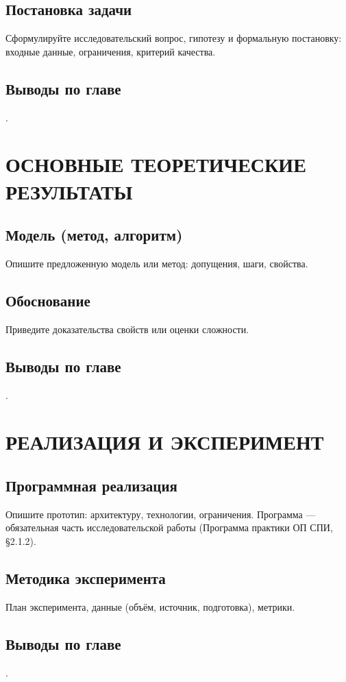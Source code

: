 \documentclass[12pt,a4paper]{extreport}
\begin{document}
\section{Постановка задачи}
Сформулируйте исследовательский вопрос, гипотезу и формальную постановку:
входные данные, ограничения, критерий качества.

\section{Выводы по главе}
.

\clearpage
\chapter{ОСНОВНЫЕ ТЕОРЕТИЧЕСКИЕ РЕЗУЛЬТАТЫ}
\section{Модель (метод, алгоритм)}
Опишите предложенную модель или метод: допущения, шаги, свойства.

\section{Обоснование}
Приведите доказательства свойств или оценки сложности.

\section{Выводы по главе}
.

\clearpage
\chapter{РЕАЛИЗАЦИЯ И ЭКСПЕРИМЕНТ}
\section{Программная реализация}
Опишите прототип: архитектуру, технологии, ограничения. Программа --- обязательная
часть исследовательской работы (Программа практики ОП СПИ, §2.1.2).

\section{Методика эксперимента}
План эксперимента, данные (объём, источник, подготовка), метрики.

\section{Выводы по главе}
.
\end{document}
